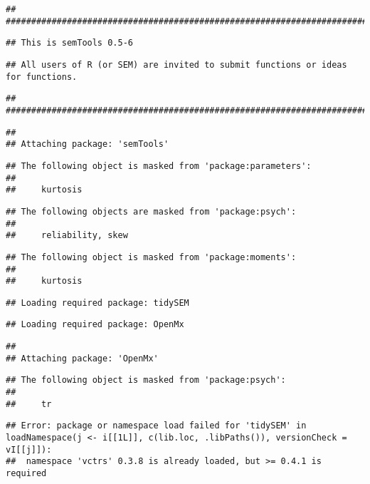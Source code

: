 \documentclass[
]{article}
\begin{document}
\begin{verbatim}
## ###############################################################################
\end{verbatim}

\begin{verbatim}
## This is semTools 0.5-6
\end{verbatim}

\begin{verbatim}
## All users of R (or SEM) are invited to submit functions or ideas for functions.
\end{verbatim}

\begin{verbatim}
## ###############################################################################
\end{verbatim}

\begin{verbatim}
## 
## Attaching package: 'semTools'
\end{verbatim}

\begin{verbatim}
## The following object is masked from 'package:parameters':
## 
##     kurtosis
\end{verbatim}

\begin{verbatim}
## The following objects are masked from 'package:psych':
## 
##     reliability, skew
\end{verbatim}

\begin{verbatim}
## The following object is masked from 'package:moments':
## 
##     kurtosis
\end{verbatim}

\begin{verbatim}
## Loading required package: tidySEM
\end{verbatim}

\begin{verbatim}
## Loading required package: OpenMx
\end{verbatim}

\begin{verbatim}
## 
## Attaching package: 'OpenMx'
\end{verbatim}

\begin{verbatim}
## The following object is masked from 'package:psych':
## 
##     tr
\end{verbatim}

\begin{verbatim}
## Error: package or namespace load failed for 'tidySEM' in loadNamespace(j <- i[[1L]], c(lib.loc, .libPaths()), versionCheck = vI[[j]]):
##  namespace 'vctrs' 0.3.8 is already loaded, but >= 0.4.1 is required
\end{verbatim}
\end{document}
